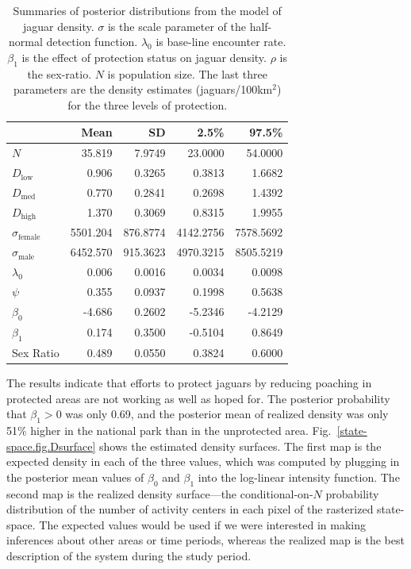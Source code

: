 \begin{table}
\centering
\caption{Summaries of posterior distributions from the model of jaguar
  density. $\sigma$ is the scale parameter of
  the half-normal detection function. $\lambda_0$ is base-line encounter rate. $\beta_1$ is the
  effect of protection status on jaguar density. $\rho$ is the
  sex-ratio.  $N$ is population size. The last three parameters are the density estimates
  (jaguars/100km$^2$) for the three levels of protection.}
\begin{tabular}{lrrrr}
\hline
& Mean & SD & 2.5\% & 97.5\% \\
\hline
 $N$ 	&   35.819 	&   7.9749 	&   23.0000 	&   54.0000 \\
 $D_\text{low}$ 	&    0.906 	&   0.3265 	&    0.3813 	&    1.6682 \\
 $D_\text{med}$ 	&    0.770 	&   0.2841 	&    0.2698 	&    1.4392 \\
 $D_\text{high}$ 	&    1.370 	&   0.3069 	&    0.8315 	&    1.9955 \\
 $\sigma_\text{female}$ 	& 5501.204 	& 876.8774 	& 4142.2756 	& 7578.5692 \\
 $\sigma_\text{male}$ 	& 6452.570 	& 915.3623 	& 4970.3215 	& 8505.5219 \\
 $\lambda_0$ 	&    0.006 	&   0.0016 	&    0.0034 	&    0.0098 \\
 $\psi$ 	&    0.355 	&   0.0937 	&    0.1998 	&    0.5638 \\
 $\beta_0$ 	&   -4.686 	&   0.2602 	&   -5.2346 	&   -4.2129 \\
 $\beta_1$ 	&    0.174 	&   0.3500 	&   -0.5104 	&    0.8649 \\
 Sex Ratio 	&    0.489 	&   0.0550 	&    0.3824 	&    0.6000 \\
 \hline
\end{tabular}
\label{state-space.tab.jagposts}
\end{table}

The results indicate that efforts to protect jaguars by reducing
poaching in protected areas are not working as well as hoped for. The
posterior probability that $\beta_1 > 0$ was only 0.69, and
the posterior mean of realized density was only 51\% higher in the national park than in the
unprotected area. Fig.~\ref{state-space.fig.Dsurface} shows the estimated
density surfaces. The first map is the expected density in each of
the three values, which was computed by plugging in the posterior mean
values of $\beta_0$ and $\beta_1$ into the log-linear intensity
function. The second map is the realized density surface---the
conditional-on-$N$ probability distribution of the number of
activity centers in each pixel of the rasterized
state-space. The expected values
would be used if we were interested in making inferences about other
areas or time periods, whereas the realized map is the best
description of the system during the study period.

